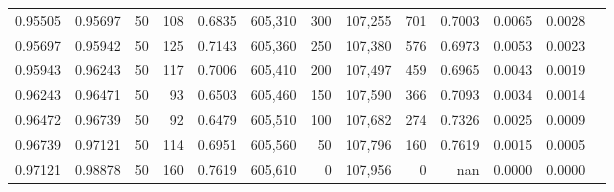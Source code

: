 \begin{tabular}{rrrrrrrrrrrrr}
0.95505 & 0.95697 &    50 & 108 &                                     0.6835 & 605,310 &     300 & 107,255 &     701 & 0.7003 & 0.0065 & 0.0028 \\
0.95697 & 0.95942 &    50 & 125 &                                     0.7143 & 605,360 &     250 & 107,380 &     576 & 0.6973 & 0.0053 & 0.0023 \\
0.95943 & 0.96243 &    50 & 117 &                                     0.7006 & 605,410 &     200 & 107,497 &     459 & 0.6965 & 0.0043 & 0.0019 \\
0.96243 & 0.96471 &    50 &  93 &                                     0.6503 & 605,460 &     150 & 107,590 &     366 & 0.7093 & 0.0034 & 0.0014 \\
0.96472 & 0.96739 &    50 &  92 &                                     0.6479 & 605,510 &     100 & 107,682 &     274 & 0.7326 & 0.0025 & 0.0009 \\
0.96739 & 0.97121 &    50 & 114 &                                     0.6951 & 605,560 &      50 & 107,796 &     160 & 0.7619 & 0.0015 & 0.0005 \\
0.97121 & 0.98878 &    50 & 160 &                                     0.7619 & 605,610 &       0 & 107,956 &       0 &    nan & 0.0000 & 0.0000 \\
\bottomrule
\end{tabular}

